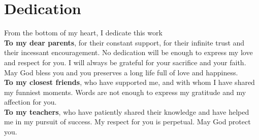 \chapter*{\Huge Dedication}

\begingroup
    \large \raggedright
    \vspace{4mm}
    \begin{center}
From the bottom of my heart, I dedicate this work\\
\textbf{To my dear parents}, for their constant support, for their infinite trust
and their incessant encouragement. No dedication will be enough
to express my love and respect for you. I will always be
grateful for your sacrifice and your faith. May God bless you and you preserves a long life full of love and happiness.\\
\textbf{To my closest friends}, who have supported me, and with whom I have
shared my funniest moments. Words are not enough to express my
gratitude and my affection for you.\\
\textbf{To my teachers}, who have patiently shared their knowledge and
have helped me in my pursuit of success. My respect for you is
perpetual. May God protect you.
\end{center}
    
    \vspace{4mm}

\endgroup

\vspace{8mm}
\begin{flushright}
    \LARGE \@author
\end{flushright}